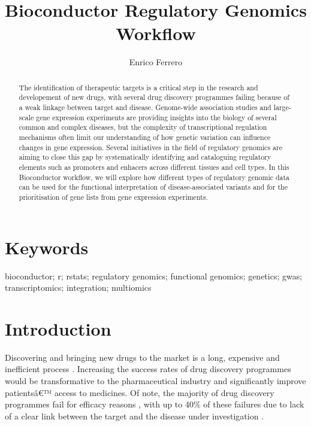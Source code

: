 \documentclass[9pt,a4paper,]{extarticle}
\begin{document}
\pagestyle{front}

\title{Bioconductor Regulatory Genomics Workflow}

\author{Enrico Ferrero}

\maketitle
\thispagestyle{front}

\begin{abstract}
The identification of therapeutic targets is a critical step in the research and developement of new drugs, with several drug discovery programmes failing because of a weak linkage between target and disease. Genome-wide association studies and large-scale gene expression experiments are providing insights into the biology of several common and complex diseases, but the complexity of transcriptional regulation mechanisms often limit our understanding of how genetic variation can influence changes in gene expression. Several initiatives in the field of regulatory genomics are aiming to close this gap by systematically identifying and cataloguing regulatory elements such as promoters and enhacers across different tissues and cell types. In this Bioconductor workflow, we will explore how different types of regulatory genomic data can be used for the functional interpretation of disease-associated variants and for the prioritisation of gene lists from gene expression experiments.
\end{abstract}

\section*{Keywords}
bioconductor; r; rstats; regulatory genomics; functional genomics; genetics; gwas; transcriptomics; integration; multiomics


\clearpage
\pagestyle{main}

\section{Introduction}\label{introduction}

Discovering and bringing new drugs to the market is a long, expensive and inefficient process \citep{Waring2015, DiMasi2016}.
Increasing the success rates of drug discovery programmes would be transformative to the pharmaceutical industry and significantly improve patientsâ\euro{}™ access to medicines.
Of note, the majority of drug discovery programmes fail for efficacy reasons \citep{Harrison2016}, with up to 40\% of these failures due to lack of a clear link between the target and the disease under investigation \citep{Cook2014}.
\end{document}
